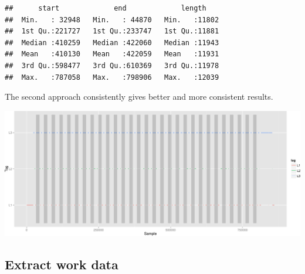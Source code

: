 \documentclass[]{article}
\newenvironment{Shaded}{\begin{snugshade}}{\end{snugshade}}
\newcommand{\KeywordTok}[1]{\textcolor[rgb]{0.13,0.29,0.53}{\textbf{{#1}}}}
\newcommand{\DataTypeTok}[1]{\textcolor[rgb]{0.13,0.29,0.53}{{#1}}}
\newcommand{\DecValTok}[1]{\textcolor[rgb]{0.00,0.00,0.81}{{#1}}}
\newcommand{\StringTok}[1]{\textcolor[rgb]{0.31,0.60,0.02}{{#1}}}
\newcommand{\NormalTok}[1]{{#1}}
\begin{document}
\begin{Shaded}
\end{Shaded}

\begin{verbatim}
##      start             end             length     
##  Min.   : 32948   Min.   : 44870   Min.   :11802  
##  1st Qu.:221727   1st Qu.:233747   1st Qu.:11881  
##  Median :410259   Median :422060   Median :11943  
##  Mean   :410130   Mean   :422059   Mean   :11931  
##  3rd Qu.:598477   3rd Qu.:610369   3rd Qu.:11978  
##  Max.   :787058   Max.   :798906   Max.   :12039
\end{verbatim}

The second approach consistently gives better and more consistent
results.

\includegraphics{AnalysisProcedure_files/figure-latex/work_runs_with_markers-1.pdf}

\subsection{Extract work data}\label{extract-work-data}

\begin{Shaded}
\end{Shaded}
\end{document}
